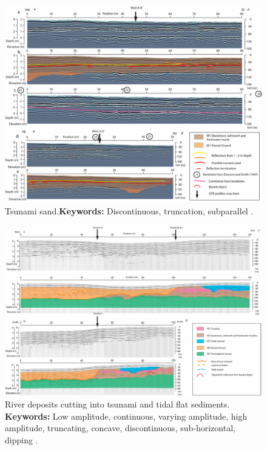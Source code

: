 \begin{figure}[h!]
    \centering
    \includegraphics[width=0.9\linewidth]{Figures/0.2GPR/Bristow_2024_1.png}
    \caption[Tsunami sand.]{Tsunami sand.\textbf{Keywords: } Discontinuous, truncation, subparallel \citep{Bristow2024}.}
    \label{fig:Bristow2024-1}
\end{figure}

\begin{figure}[h!]
    \centering
    \includegraphics[width=0.9\linewidth]{Figures/0.2GPR/Bristow_2024_5.png}
    \caption[River deposits cutting into tsunami and tidal flat sediments.]{River deposits cutting into tsunami and tidal flat sediments. \textbf{Keywords: } Low amplitude, continuous, varying amplitude, high amplitude, truncating, concave, discontinuous, sub-horizontal, dipping  \citep{Bristow2024}.}
    \label{fig:Bristow2024-5}
\end{figure}

